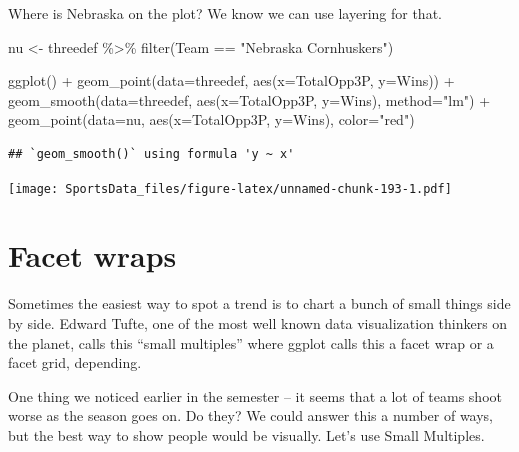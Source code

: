 \documentclass[
]{book}
\newenvironment{Shaded}{\begin{snugshade}}{\end{snugshade}}
\newcommand{\AttributeTok}[1]{\textcolor[rgb]{0.77,0.63,0.00}{#1}}
\newcommand{\FunctionTok}[1]{\textcolor[rgb]{0.00,0.00,0.00}{#1}}
\newcommand{\NormalTok}[1]{#1}
\newcommand{\OtherTok}[1]{\textcolor[rgb]{0.56,0.35,0.01}{#1}}
\newcommand{\SpecialCharTok}[1]{\textcolor[rgb]{0.00,0.00,0.00}{#1}}
\newcommand{\StringTok}[1]{\textcolor[rgb]{0.31,0.60,0.02}{#1}}
\begin{document}
Where is Nebraska on the plot? We know we can use layering for that.

\begin{Shaded}
\begin{Highlighting}[]
\NormalTok{nu }\OtherTok{\textless{}{-}}\NormalTok{ threedef }\SpecialCharTok{\%\textgreater{}\%} \FunctionTok{filter}\NormalTok{(Team }\SpecialCharTok{==} \StringTok{"Nebraska Cornhuskers"}\NormalTok{)}
\end{Highlighting}
\end{Shaded}

\begin{Shaded}
\begin{Highlighting}[]
\FunctionTok{ggplot}\NormalTok{() }\SpecialCharTok{+} 
  \FunctionTok{geom\_point}\NormalTok{(}\AttributeTok{data=}\NormalTok{threedef, }\FunctionTok{aes}\NormalTok{(}\AttributeTok{x=}\NormalTok{TotalOpp3P, }\AttributeTok{y=}\NormalTok{Wins)) }\SpecialCharTok{+}
  \FunctionTok{geom\_smooth}\NormalTok{(}\AttributeTok{data=}\NormalTok{threedef, }\FunctionTok{aes}\NormalTok{(}\AttributeTok{x=}\NormalTok{TotalOpp3P, }\AttributeTok{y=}\NormalTok{Wins), }\AttributeTok{method=}\StringTok{"lm"}\NormalTok{) }\SpecialCharTok{+}
  \FunctionTok{geom\_point}\NormalTok{(}\AttributeTok{data=}\NormalTok{nu, }\FunctionTok{aes}\NormalTok{(}\AttributeTok{x=}\NormalTok{TotalOpp3P, }\AttributeTok{y=}\NormalTok{Wins), }\AttributeTok{color=}\StringTok{"red"}\NormalTok{)}
\end{Highlighting}
\end{Shaded}

\begin{verbatim}
## `geom_smooth()` using formula 'y ~ x'
\end{verbatim}

\texttt{[image: SportsData\_files/figure-latex/unnamed-chunk-193-1.pdf]}

\hypertarget{facet-wraps}{%
\chapter{Facet wraps}\label{facet-wraps}}

Sometimes the easiest way to spot a trend is to chart a bunch of small things side by side. Edward Tufte, one of the most well known data visualization thinkers on the planet, calls this ``small multiples'' where ggplot calls this a facet wrap or a facet grid, depending.

One thing we noticed earlier in the semester -- it seems that a lot of teams shoot worse as the season goes on. Do they? We could answer this a number of ways, but the best way to show people would be visually. Let's use Small Multiples.
\end{document}

